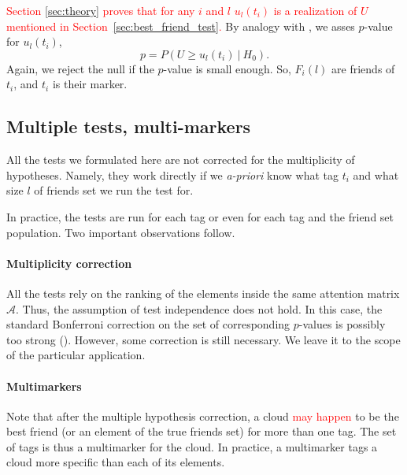 \documentclass{llncs}
\begin{document}

 







\textcolor{red}{Section \ref{sec:theory} proves that for any $i$ and $l$ $u_l(t_i)$ is a realization of $U$ mentioned in Section~\ref{sec:best_friend_test}.}
By analogy with , we asses $p$-value for $u_{l}(t_i)$,
\[
p = P\left(U \ge u_l(t_i)~|~H_0\right). 
\]
Again, we reject the null if the $p$-value is small enough. So, $F_{i}(l)$ are friends of $t_i$, and $t_i$ is their marker.


\subsection{Multiple tests, multi-markers}
\label{sec:multimurkers}

All the tests we formulated here are not corrected for the multiplicity of hypotheses. Namely, they work directly if we \textit{a-priori} know what tag $t_i$ and what size $l$ of friends set we run the test for. 

In practice, the tests are run for each tag or even for each tag and the friend set population. Two important observations follow.

\paragraph*{Multiplicity correction} All the tests rely on the ranking of the elements inside the same attention matrix $\mathcal{A}$. Thus, the assumption of test independence does not hold. In this case, the standard Bonferroni correction on the set of corresponding $p$-values is possibly too strong (\cite{cabin2000bonferroni}). However, some correction is still necessary. We leave it to the scope of the particular application.

\paragraph*{Multimarkers} Note that after the multiple hypothesis correction, a cloud \textcolor{red}{may happen}
to be the best friend (or an element of the true friends set) for more than one tag. The set of tags is thus a multimarker for the cloud. In practice, a multimarker tags a cloud more specific than each of its elements.
\end{document}
